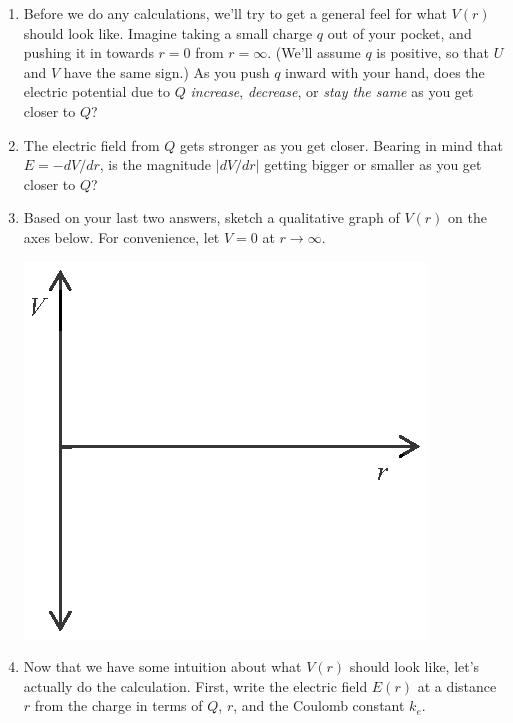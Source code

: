 \begin{enumerate}[wide, label=(\emph{\alph*})]

\item Before we do any calculations, we'll try to get a general feel for what $V(r)$ should look like.  Imagine taking a small charge $q$ out of your pocket, and pushing it in towards $r=0$ from $r=\infty$.  (We'll assume $q$ is positive, so that $U$ and $V$ have the same sign.)  As you push $q$ inward with your hand, does the electric potential due to $Q$ \textit{increase}, \textit{decrease}, or \textit{stay the same} as you get closer to $Q$?
\answerspace{0.4in}

\item The electric field from $Q$ gets stronger as you get closer.  Bearing in mind that $E = -dV/dr$, is the magnitude $\left | {dV}/{dr}\right |$ getting bigger or smaller as you get closer to $Q$?
\answerspace{0.4in}

\item Based on your last two answers, sketch a qualitative graph of $V(r)$ on the axes below.  For convenience, let $V=0$ at $r \rightarrow \infty$. \label{part_potential_intro_sketch_of_Vr}
\begin{center}
\includegraphics{potential_intro/activity_6_figs/V_axes.eps}
\end{center}

\pagebreak[2]
\item Now that we have some intuition about what $V(r)$ should look like, let's actually do the calculation.  First, write the electric field $E(r)$ at a distance $r$ from the charge in terms of $Q$, $r$, and the Coulomb constant $k_e$.
\answerspace{0.5in}


\end{enumerate}
